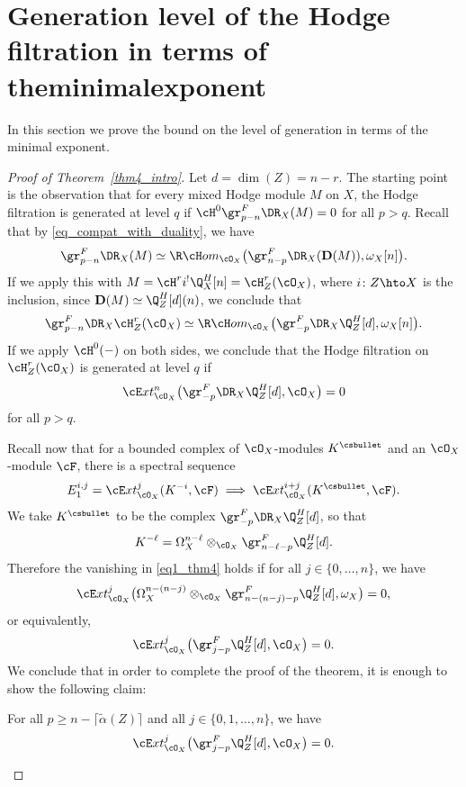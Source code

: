 \section{Generation level of the Hodge filtration in terms of the\nobreakspace minimal\nobreakspace exponent}\label{section4}

In this section we prove the bound on the level of generation in terms of the minimal exponent.

\begin{proof}[Proof of Theorem~\ref{thm4_intro}]
Let $d=\dim(Z)=n-r$.
The starting point is the observation that for every mixed Hodge module $M$ on $X$, the Hodge filtration is generated at level $q$ if $\cH^0 \gr^F_{p-n} \DR_X(M) = 0$ for all $p >q$. Recall that by \eqref{eq_compat_with_duality}, we have
\[ \gr^F_{p-n} \DR_X(M)\simeq \R\cH om_{\cO_X}\big(\gr^F_{n-p}\DR_X(\mathbf D(M)),\omega_X[n]\big).\]
If we apply this with $M=\cH^ri^!\Q_X^H[n]=\cH^r_Z(\cO_X)$, where $i\colon Z\hto X$ is the inclusion,
since ${\mathbf D}(M)\simeq \Q^H_Z[d](n)$, we conclude that
\[ \gr^F_{p-n} \DR_X \cH^r_Z(\cO_X) \simeq \R\cH om_{\cO_X}\big(\gr^F_{-p}\DR_X\Q_Z^H[d],\omega_X[n]\big).\]
If we apply $\cH^0(-)$ on both sides, we conclude that the Hodge filtration on $\cH^r_Z(\cO_X)$ is generated at level $q$ if
\begin{equation}\label{eq1_thm4}
\cE xt^n_{\cO_X}\big(\gr^F_{-p} \DR_X\Q_Z^H[d],\cO_X\big) = 0
\end{equation}
for all $p>q$.

Recall now that for a bounded complex of $\cO_X$-modules $K^\csbullet$ and an $\cO_X$-module $\cF$,
there is a spectral sequence
\[ E_1^{i,j} = \cE xt_{\cO_X}^j(K^{-i},\cF) \implies \cE xt^{i+j}_{\cO_X}(K^\csbullet,\cF).\]
We take $K^{\csbullet}$ to be the complex $\gr^F_{-p}\DR_X\Q_Z^H[d]$, so that
\[K^{-\ell}=\Omega_X^{n-\ell}\otimes_{\cO_X}\gr^F_{n-\ell-p}\Q_Z^H[d].\]
Therefore the vanishing in \eqref{eq1_thm4} holds if
for all $j\in\{0,\ldots,n\}$, we have\vspace*{-3pt}
\[ \cE xt_{\cO_X}^j \big(\Omega_X^{n-(n-j)}\otimes_{\cO_X}\gr^F_{n-(n-j)-p}\Q_Z^H[d],\omega_X\big)=0,\]
or equivalently,\vspace*{-3pt}
\[ \cE xt_{\cO_X}^j \big(\gr^F_{j-p}\Q_Z^H[d], \cO_X\big) = 0.\]
We conclude that in order to complete the proof of the theorem, it is enough to show
the following claim:
\begin{claim} For all $p \geq n - \lceil \widetilde{\alpha}(Z) \rceil$ and all $j\in \{0,1,\dots, n\}$, we have\vspace*{-3pt}
\begin{equation}\label{eq_claim}
\cE xt_{\cO_X}^j \big(\gr^F_{j-p}\Q_Z^H[d], \cO_X\big) = 0.
\end{equation}
\end{claim}


\end{proof}
